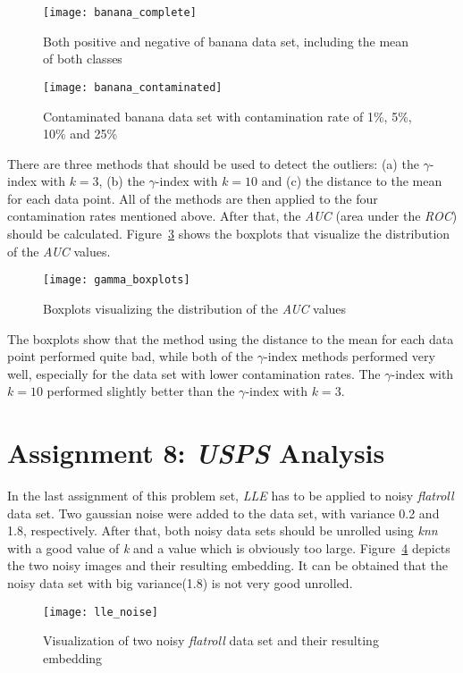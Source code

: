 \begin{figure}[h!]
	\centering
	\texttt{[image: banana\_complete]}
	\caption{Both positive and negative of banana data set, including the mean of both classes}
	\label{fig:bananacomplete}
\end{figure}

\begin{figure}[h!]
	\centering
	\texttt{[image: banana\_contaminated]}
	\caption{Contaminated banana data set with contamination rate of 1\%, 5\%, 10\% and 25\%}
	\label{fig:bananacontaminated}
\end{figure}

There are three methods that should be used to detect the outliers: (a) the $\gamma$-index with $k=3$, (b) the $\gamma$-index with $k=10$ and (c) the distance to the mean for each data point. All of the methods are then applied to the four contamination rates mentioned above. After that, the \textit{AUC} (area under the \textit{ROC}) should be calculated. Figure~\ref{fig:gammaboxplots} shows the boxplots that visualize the distribution of the \textit{AUC} values.

\begin{figure}[h!]
	\centering
	\texttt{[image: gamma\_boxplots]}
	\caption{Boxplots visualizing the distribution of the \textit{AUC} values}
	\label{fig:gammaboxplots}
\end{figure}

The boxplots show that the method using the distance to the mean for each data point performed quite bad, while both of the $\gamma$-index methods performed very well, especially for the data set with lower contamination rates. The $\gamma$-index with $k=10$ performed slightly better than the $\gamma$-index with $k=3$.



\section{Assignment 8: \textit{USPS} Analysis}
\label{assignment8}

In the last assignment of this problem set, \textit{LLE} has to be applied to noisy \textit{flatroll} data set. Two gaussian noise were added to the data set, with variance 0.2 and 1.8, respectively. After that, both noisy data sets should be unrolled using \textit{knn} with a good value of \textit{k} and a value which is obviously too large. Figure~\ref{fig:llenoisy} depicts the two noisy images and their resulting embedding. It can be obtained that the noisy data set with big variance(1.8) is not very good unrolled.

\begin{figure}[h!]
	\centering
	\texttt{[image: lle\_noise]}
	\caption{Visualization of two noisy \textit{flatroll} data set and their resulting embedding}
	\label{fig:llenoisy}
\end{figure}

